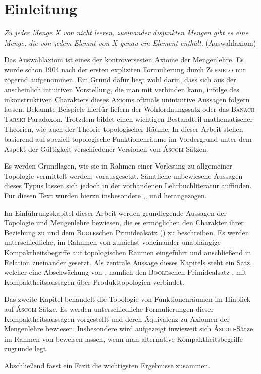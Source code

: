 \chapter*{Einleitung}

\begin{addmargin}[2em]{2em}%
  \textit{Zu jeder Menge $X$ von nicht leeren, zueinander disjunkten Mengen gibt es eine Menge, die von jedem Elemnt von $X$ genau ein Element enthält.} 
  \flushright(Auswahlaxiom)
\end{addmargin}

Das Auswahlaxiom \AC ist eines der kontroversesten Axiome der Mengenlehre.
Es wurde schon 1904 nach der ersten expliziten Formulierung durch \textsc{Zermelo} nur zögernd aufgenommen. 
Ein Grund dafür liegt wohl darin, dass sich aus der anscheinlich intuitiven Vorstellung, die man mit \AC verbinden kann, infolge des inkonstruktiven Charakters dieses Axioms oftmals unintuitive Aussagen folgern lassen.
Bekannte Beispiele hierfür liefern der Wohlordnungssatz oder das \textsc{Banach}-\textsc{Tarski}-Paradoxon.
Trotzdem bildet \AC einen wichtigen Bestandteil mathematischer Theorien, wie auch der Theorie topologischer Räume.
In dieser Arbeit stehen basierend auf \cite{herrlich2006axiom} speziell topologische Funktionenräume im Vordergrund unter dem Aspekt der Gültigkeit verschiedener Versionen von \textsc{Áscoli}-Sätzen.

Es werden Grundlagen, wie sie in Rahmen einer Vorlesung zu allgemeiner Topologie vermittelt werden, vorausgesetzt.
Sämtliche unbewiesene Aussagen dieses Typus lassen sich jedoch in der vorhandenen Lehrbuchliteratur auffinden.
Für diesen Text wurden hierzu insbesondere \cite{bartsch2015allgemeine},\cite{ebbinghaus2003einfuhrung},\cite{preuss1972topologische} und \cite{kelley1975general} herangezogen.

Im Einführungskapitel dieser Arbeit werden grundlegende Aussagen der Topologie und Mengenlehre bewiesen, die es ermöglichen den Charakter ihrer Beziehung zu \AC und dem \textsc{Boole}schen Primidealsatz (\PIT) zu beschreiben. 
Es werden unterschiedliche, im Rahnmen von \ZF zunächst voneinander unabhängige Kompaktheitsbegriffe auf topologischen Räumen eingeführt und anschließend in Relation zueinander gesetzt.
Als zentrale Aussage dieses Kapitels steht ein Satz, welcher eine Abschwächung von \AC, namlich den \textsc{Boole}schen Primidealsatz \PIT, mit Kompaktheitsaussagen über Produkttopologien verbindet.

Das zweite Kapitel behandelt die Topologie von Funktionenräumen im Hinblick auf \textsc{Áscoli}-Sätze.
Es werden unterschiedliche Formulierungen dieser Kompaktheitsaussagen vorgestellt und deren Äquivalenz zu Axiomen der Mengenlehre bewiesen.
Insbesondere wird aufgezeigt inwieweit sich \textsc{Áscoli}-Sätze im Rahmen von \ZF beweisen lassen, wenn man alternative Kompaktheitsbegriffe zugrunde legt.

Abschließend fasst ein Fazit die wichtigsten Ergebnisse zusammen.

